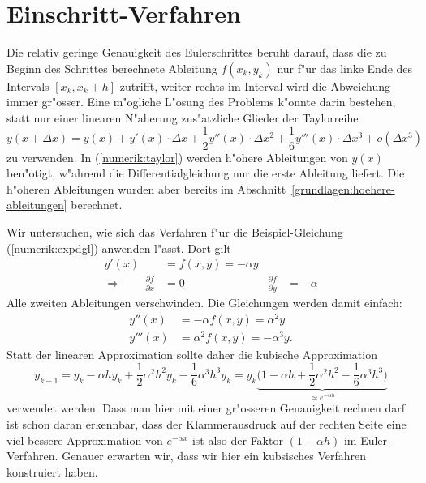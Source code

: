 \section{Einschritt-Verfahren\label{section:numerik:einschritt}}
Die relativ geringe Genauigkeit des Eulerschrittes beruht darauf,
dass die zu Beginn des Schrittes berechnete Ableitung $f(x_k,y_k)$
nur f"ur das linke Ende des Intervals $[x_k, x_k+h]$ zutrifft,
weiter rechts im Interval wird die Abweichung immer gr"osser.
Eine m"ogliche L"osung des Problems k"onnte darin bestehen, statt
nur einer linearen N"aherung zus"atzliche Glieder der Taylorreihe
\begin{equation}
y(x+\Delta x)
=
y(x)
+
y'(x)\cdot \Delta x
+
\frac12 y''(x)\cdot \Delta x^2
+
\frac16 y'''(x)\cdot \Delta x^3
+
o(\Delta x^3)
\label{numerik:taylor}
\end{equation}
zu verwenden.
In (\ref{numerik:taylor}) werden h"ohere Ableitungen von $y(x)$ ben"otigt,
w"ahrend die Differentialgleichung nur die erste Ableitung liefert.
Die h"oheren Ableitungen wurden aber bereits im
Abschnitt~\ref{grundlagen:hoehere-ableitungen} berechnet.

Wir untersuchen, wie sich das Verfahren f"ur die Beispiel-Gleichung
(\ref{numerik:expdgl}) anwenden l"asst.
Dort gilt
\begin{equation*}
\begin{aligned}
y'(x)&=f(x,y)=-\alpha y
\\
\Rightarrow\qquad
\frac{\partial f}{\partial x}&=0&\frac{\partial f}{\partial y}&=-\alpha
\end{aligned}
\end{equation*}
Alle zweiten Ableitungen verschwinden.
Die Gleichungen werden damit einfach:
\begin{align*}
y''(x)&=-\alpha f(x,y)=\alpha^2 y
\\
y'''(x)&=\alpha^2f(x,y)=-\alpha^3 y.
\end{align*}
Statt der linearen Approximation sollte daher die kubische Approximation
\begin{equation}
y_{k+1}
=
y_{k}-\alpha h y_k +\frac12\alpha^2 h^2 y_k -\frac16 \alpha^3h^3 y_k
=
y_{k}\underbrace{\biggl(1-\alpha h +\frac12\alpha^2h^2 -\frac16 \alpha^3h^3\biggr)}_{\simeq e^{-\alpha h}}
\label{numerik:kubisch}
\end{equation}
verwendet werden.
Dass man hier mit einer gr"osseren Genauigkeit rechnen darf ist schon daran
erkennbar, dass der Klammerausdruck auf der rechten Seite eine viel
bessere Approximation von $e^{-\alpha x}$ ist also der Faktor
$(1-\alpha h)$ im Euler-Verfahren.
Genauer erwarten wir, dass wir hier ein kubsisches Verfahren konstruiert haben.

